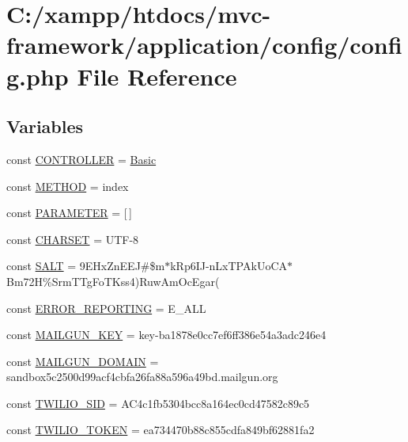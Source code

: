 \hypertarget{config_8php}{}\section{C\+:/xampp/htdocs/mvc-\/framework/application/config/config.php File Reference}
\label{config_8php}
\subsection*{Variables}
\begin{DoxyCompactItemize}
\item 
const \hyperlink{config_8php_afa55a6839ec4ad32fc00879d78229356}{C\+O\+N\+T\+R\+O\+L\+L\+E\+R} = \textquotesingle{}\hyperlink{class_basic}{Basic}\textquotesingle{}
\item 
const \hyperlink{config_8php_a9d70943cac2f50debb62d2008a6e768d}{M\+E\+T\+H\+O\+D} = \textquotesingle{}index\textquotesingle{}
\item 
const \hyperlink{config_8php_a75466fbd8ac40be3d3c185c9974118e7}{P\+A\+R\+A\+M\+E\+T\+E\+R} = \mbox{[}$\,$\mbox{]}
\item 
const \hyperlink{config_8php_a4ca86066304d2cbb779bd8afd1efe17b}{C\+H\+A\+R\+S\+E\+T} = \textquotesingle{}U\+T\+F-\/8\textquotesingle{}
\item 
const \hyperlink{config_8php_a6d448b74f10f8080293b329a47a046b4}{S\+A\+L\+T} = \textquotesingle{}9\+E\+Hx\+Zn\+E\+E\+J\#\$m$\ast$k\+Rp6\+I\+J-\/n\+Lx\+T\+P\+Ak\+Uo\+C\+A$\ast$\+Bm72\+H\%\+Srm\+T\+Tg\+Fo\+T\+Kss4)\+Ruw\+Am\+Oc\+Egar(\textquotesingle{}
\item 
const \hyperlink{config_8php_a80c2f40a4ce1ad3cbfb1978239f63c31}{E\+R\+R\+O\+R\+\_\+\+R\+E\+P\+O\+R\+T\+I\+N\+G} = E\+\_\+\+A\+L\+L
\item 
const \hyperlink{config_8php_ad320bd8d96c22e094fb9b774f269aaef}{M\+A\+I\+L\+G\+U\+N\+\_\+\+K\+E\+Y} = \textquotesingle{}key-\/ba1878e0cc7ef6ff386e54a3adc246e4\textquotesingle{}
\item 
const \hyperlink{config_8php_a2de069ac064bb137af53d99e3fcff3c8}{M\+A\+I\+L\+G\+U\+N\+\_\+\+D\+O\+M\+A\+I\+N} = \textquotesingle{}sandbox5c2500d99acf4cbfa26fa88a596a49bd.\+mailgun.\+org\textquotesingle{}
\item 
const \hyperlink{config_8php_a9b6aafbdebd605cd4fb6f5749b53e59f}{T\+W\+I\+L\+I\+O\+\_\+\+S\+I\+D} = \textquotesingle{}A\+C4c1fb5304bcc8a164ec0cd47582c89c5\textquotesingle{}
\item 
const \hyperlink{config_8php_a0477d5c66524299f08cae7376eb7884c}{T\+W\+I\+L\+I\+O\+\_\+\+T\+O\+K\+E\+N} = \textquotesingle{}ea734470b88c855cdfa849bf62881fa2\textquotesingle{}
\end{DoxyCompactItemize}


